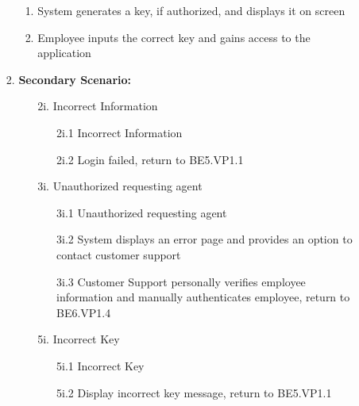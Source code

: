 \documentclass[]{article}
\begin{document}
\begin{enumerate}[{\bf BE1.}]
\begin{enumerate}[{\bf BE5.}]
\begin{enumerate}
\begin{enumerate}
                \item System generates a key, if authorized, and displays it on screen 
                \item Employee inputs the correct key and gains access to the application 
            \end{enumerate}
            \item \textbf{Secondary Scenario:}
            \begin{enumerate}
                \item[2i.] Incorrect Information
                \begin{enumerate}
                    \item[2i.1] Incorrect Information
                    \item[2i.2] Login failed, return to BE5.VP1.1
                \end{enumerate}
                \item[3i.] Unauthorized requesting agent
                \begin{enumerate}
                    \item[3i.1] Unauthorized requesting agent
                    \item[3i.2] System displays an error page and provides an option to contact customer support
                    \item[3i.3]  Customer Support personally verifies employee information and manually authenticates employee, return to BE6.VP1.4
                \end{enumerate}
                \item[5i.] Incorrect Key
                \begin{enumerate}
                    \item[5i.1] Incorrect Key
                    \item[5i.2] Display incorrect key message, return to BE5.VP1.1 
                \end{enumerate}
            \end{enumerate}
        \end{enumerate}
\end{enumerate}


\end{enumerate}
\end{document}
